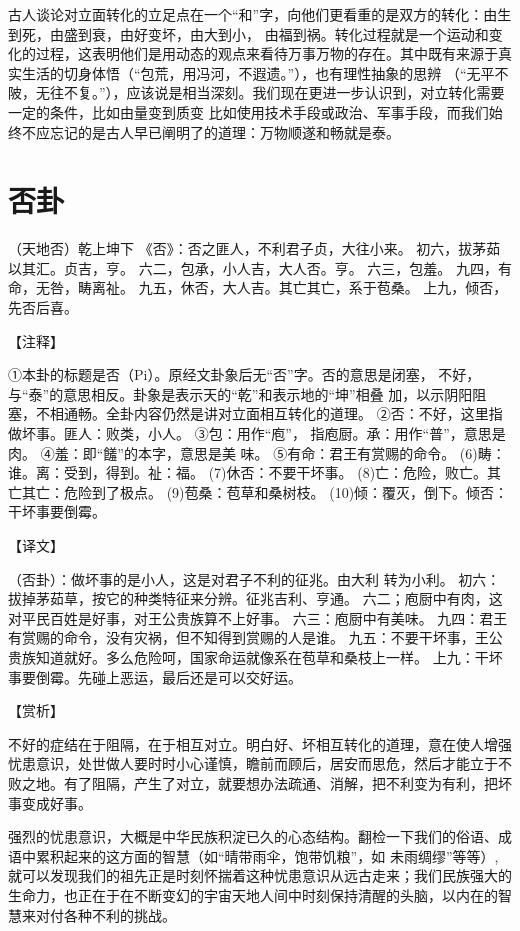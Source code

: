 \documentclass[a4paper,12pt,UTF8,twoside]{ctexbook}
\begin{document}
古人谈论对立面转化的立足点在一个“和”字，向他们更看重的是双方的转化：由生到死，由盛到衰，由好变坏，由大到小， 由福到祸。转化过程就是一个运动和变化的过程，这表明他们是用动态的观点来看待万事万物的存在。其中既有来源于真实生活的切身体悟（“包荒，用冯河，不遐遗。”），也有理性抽象的思辨 （“无平不陂，无往不复。”），应该说是相当深刻。我们现在更进一步认识到，对立转化需要一定的条件，比如由量变到质变 比如使用技术手段或政治、军事手段，而我们始终不应忘记的是古人早已阐明了的道理：万物顺遂和畅就是泰。

\chapter{否卦}

（天地否）乾上坤下
《否》：否之匪人，不利君子贞，大往小来。
初六，拔茅茹以其汇。贞吉，亨。
六二，包承，小人吉，大人否。亨。
六三，包羞。
九四，有命，无咎，畴离祉。
九五，休否，大人吉。其亡其亡，系于苞桑。
上九，倾否，先否后喜。

【注释】

①本卦的标题是否（Pi）。原经文卦象后无“否”字。否的意思是闭塞， 不好，与“泰”的意思相反。卦象是表示天的“乾”和表示地的“坤”相叠 加，以示阴阳阻塞，不相通畅。全卦内容仍然是讲对立面相互转化的道理。
②否：不好，这里指做坏事。匪人：败类，小人。
③包：用作“庖”， 指庖厨。承：用作“普”，意思是肉。
④羞：即“饈”的本字，意思是美 味。
⑤有命：君王有赏赐的命令。
(6)畴：谁。离：受到，得到。祉：福。
(7)休否：不要干坏事。
(8)亡：危险，败亡。其亡其亡：危险到了极点。
(9)苞桑：苞草和桑树枝。
(10)倾：覆灭，倒下。倾否：干坏事要倒霉。

【译文】

（否卦）：做坏事的是小人，这是对君子不利的征兆。由大利 转为小利。
初六：拔掉茅茹草，按它的种类特征来分辨。征兆吉利、亨通。
六二；庖厨中有肉，这对平民百姓是好事，对王公贵族算不上好事。
六三：庖厨中有美味。
九四：君王有赏赐的命令，没有灾祸，但不知得到赏赐的人是谁。
九五：不要干坏事，王公贵族知道就好。多么危险呵，国家命运就像系在苞草和桑枝上一样。
上九：干坏事要倒霉。先碰上恶运，最后还是可以交好运。

【赏析】

不好的症结在于阻隔，在于相互对立。明白好、坏相互转化的道理，意在使人增强忧患意识，处世做人要时时小心谨慎，瞻前而顾后，居安而思危，然后才能立于不败之地。有了阻隔，产生了对立，就要想办法疏通、消解，把不利变为有利，把坏事变成好事。

强烈的忧患意识，大概是中华民族积淀已久的心态结构。翻检一下我们的俗语、成语中累积起来的这方面的智慧（如“晴带雨伞，饱带饥粮”，如 未雨绸缪”等等）, 就可以发现我们的祖先正是时刻怀揣着这种忧患意识从远古走来；我们民族强大的生命力，也正在于在不断变幻的宇宙天地人间中时刻保持清醒的头脑，以内在的智慧来对付各种不利的挑战。
\end{document}

